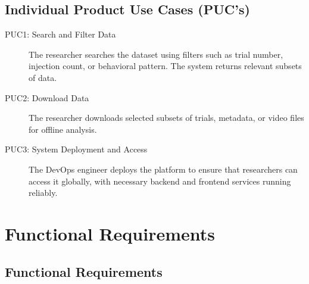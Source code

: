 \documentclass[12pt]{article}
\begin{document}
\subsection{Individual Product Use Cases (PUC’s)}

\begin{description}
\item[PUC1: Search and Filter Data] The researcher searches the dataset using filters such as trial number, injection count, or behavioral pattern. The system returns relevant subsets of data.
\item[PUC2: Download Data] The researcher downloads selected subsets of trials, metadata, or video files for offline analysis.
\item[PUC3: System Deployment and Access] The DevOps engineer deploys the platform to ensure that researchers can access it globally, with necessary backend and frontend services running reliably.
\end{description}

\section{Functional Requirements}
\subsection{Functional Requirements}
\end{document}
